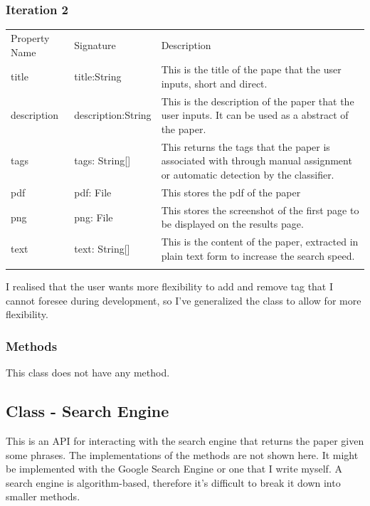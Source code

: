 \documentclass[
]{article}
\begin{document}
\hypertarget{iteration-2-3}{%
\subsubsection{Iteration 2}\label{iteration-2-3}}

\begin{longtable}[]{@{}
  >{\raggedright\arraybackslash}p{}
  >{\raggedright\arraybackslash}p{}
  >{\raggedright\arraybackslash}p{}@{}}
\toprule
Property Name & Signature & Description \\ \addlinespace
\midrule
\endhead
title & title:String & This is the title of the pape that the user
inputs, short and direct. \\ \addlinespace
description & description:String & This is the description of the paper
that the user inputs. It can be used as a abstract of the
paper. \\ \addlinespace
tags & tags: String{[}{]} & This returns the tags that the paper is
associated with through manual assignment or automatic detection by the
classifier. \\ \addlinespace
pdf & pdf: File & This stores the pdf of the paper \\ \addlinespace
png & png: File & This stores the screenshot of the first page to be
displayed on the results page. \\ \addlinespace
text & text: String{[}{]} & This is the content of the paper, extracted
in plain text form to increase the search speed. \\ \addlinespace
\bottomrule
\end{longtable}

I realised that the user wants more flexibility to add and remove tag
that I cannot foresee during development, so I've generalized the class
to allow for more flexibility.

\hypertarget{methods}{%
\subsubsection{Methods}\label{methods}}

This class does not have any method.

\hypertarget{class---search-engine}{%
\subsection{Class - Search Engine}\label{class---search-engine}}

This is an API for interacting with the search engine that returns the
paper given some phrases. The implementations of the methods are not
shown here. It might be implemented with the Google Search Engine or one
that I write myself. A search engine is algorithm-based, therefore it's
difficult to break it down into smaller methods.
\end{document}
